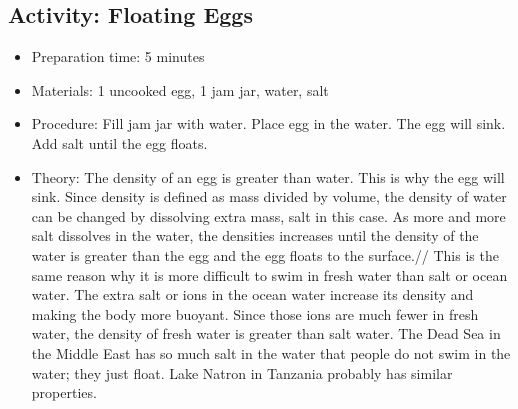 \begin{itemize}
{\begin{itemize}
\subsection{Activity: Floating Eggs}
\begin{itemize}
\item{Preparation time: 5 minutes}
\item{Materials: 1 uncooked egg, 1 jam jar, water, salt}
\item{Procedure: Fill jam jar with water. Place egg in the water. The egg will sink. Add salt until the egg floats. }
\item{Theory: The density of an egg is greater than water. This is why the egg will sink. Since density is defined as mass divided by volume, the density of water can be changed by dissolving extra mass, salt in this case. As more and more salt dissolves in the water, the densities increases until the density of the water is greater than the egg and the egg floats to the surface.//
This is the same reason why it is more difficult to swim in fresh water than salt or ocean water. The extra salt or ions in the ocean water increase its density and making the body more buoyant. Since those ions are much fewer in fresh water, the density of fresh water is greater than salt water. The Dead Sea in the Middle East has so much salt in the water that people do not swim in the water; they just float. Lake Natron in Tanzania probably has similar properties.}
\end{itemize}


\end{itemize}}
\end{itemize}
